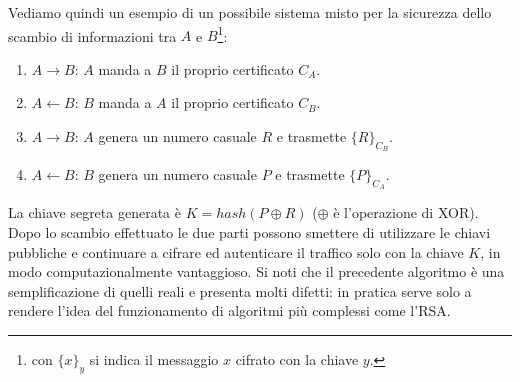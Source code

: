 Vediamo quindi un esempio di un possibile sistema misto per la sicurezza dello scambio di informazioni tra $A$ e $B$\footnote{con $\{x\}_y$ si indica il messaggio $x$ cifrato con la chiave $y$.}:
\begin{enumerate}
	\item $A\to B$: $A$ manda a $B$ il proprio certificato $C_A$.
	\item $A \leftarrow B$:  $B$ manda a $A$ il proprio certificato $C_B$.
	\item $A\to B$: $A$ genera un numero casuale $R$ e trasmette $\{R\}_{C_B}$.
	\item $A\leftarrow B$: $B$ genera un numero casuale $P$ e trasmette $\{P\}_{C_A}$.
\end{enumerate}
La chiave segreta generata è $K=hash(P\oplus R)$ ($\oplus$ è l'operazione di XOR). Dopo lo scambio effettuato le due parti possono smettere di utilizzare le chiavi pubbliche e continuare a cifrare ed autenticare il traffico solo con la chiave $K$, in modo computazionalmente vantaggioso. Si noti che il precedente algoritmo è una semplificazione di quelli reali e presenta molti difetti: in pratica serve solo a rendere l'idea del funzionamento di algoritmi più complessi come l'RSA.

